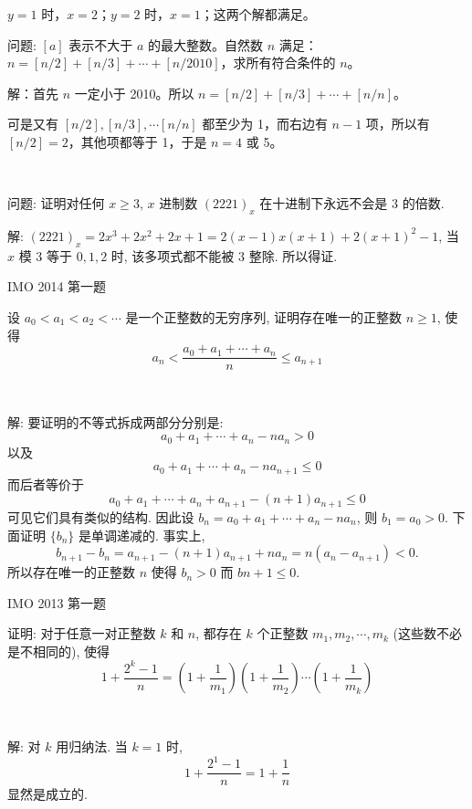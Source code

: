 $ y=1 $ 时，$ x=2 $；$ y=2 $ 时，$ x=1 $；这两个解都满足。

\newpage
问题: $ [a] $ 表示不大于 $ a $ 的最大整数。自然数 $ n $ 满足：$ n=[n/2]+[n/3]+\cdots +[n/2010] $，求所有符合条件的 $ n $。

解：首先 $ n $ 一定小于 2010。所以 $ n=[n/2]+[n/3]+\cdots +[n/n] $。

可是又有 $ [n/2],[n/3],\cdots [n/n] $ 都至少为 1，而右边有 $ n-1 $ 项，所以有 $ [n/2]=2 $，其他项都等于 1，于是 $ n=4 $ 或 5。

~

问题: 证明对任何 $x\ge 3$, $x$ 进制数 $(2221)_x$ 在十进制下永远不会是 3 的倍数.

解: $(2221)_x = 2x^3+2x^2+2x+1 = 2(x-1)x(x+1)+2(x+1)^2-1$, 当 $x$ 模 3 等于 $0,1,2$ 时, 该多项式都不能被 3 整除. 所以得证.


\newpage
\noindent IMO 2014 第一题

设 $a_0 < a_1 < a_2 < \cdots$ 是一个正整数的无穷序列, 证明存在唯一的正整数 $n \ge 1$, 使得
\[ a_n < \frac{a_0+a_1+\cdots+a_n}{n} \le a_{n+1}\]

~

解: 要证明的不等式拆成两部分分别是: 
\[a_0 + a_1 + \cdots + a_n - na_n > 0 \]
以及
\[a_0 + a_1 + \cdots + a_n - na_{n+1} \le 0\]
而后者等价于 
\[a_0 + a_1 + \cdots + a_n + a_{n+1} - (n+1)a_{n+1} \le 0\]
可见它们具有类似的结构. 因此设 $b_n = a_0 + a_1 + \cdots + a_n - na_n$, 则 $b_1 = a_0 > 0$. 下面证明 $\{b_n\}$ 是单调递减的. 事实上, 
\[b_{n+1} - b_n = a_{n+1} - (n+1)a_{n+1} + na_n = n(a_n - a_{n+1}) < 0 .\]
所以存在唯一的正整数 $n$ 使得 $b_n > 0$ 而 $b{n+1} \le 0$.


\newpage
\noindent IMO 2013 第一题

证明: 对于任意一对正整数 $k$ 和 $n$, 都存在 $k$ 个正整数 $m_1, m_2, \cdots, m_k$ (这些数不必是不相同的), 使得
\[1 + \frac{2^k-1}{n} = \left(1+\frac{1}{m_1}\right)\left(1+\frac{1}{m_2}\right)\cdots\left(1+\frac{1}{m_k}\right)\]

~

解: 对 $k$ 用归纳法. 当 $k=1$ 时, 
\[1 + \frac{2^1 - 1}{n} = 1+\frac{1}{n}\]
显然是成立的.

